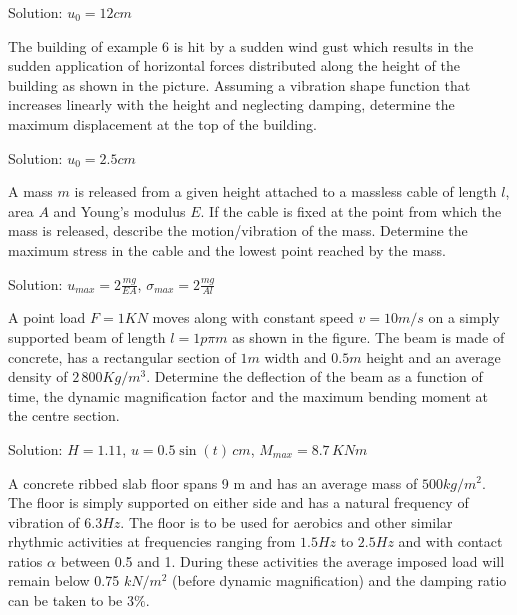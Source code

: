 \documentclass{problems}
\begin{document}
\begin{center}
\end{center}

Solution: $u_0 = 12cm$



 The building of example 6 is hit by a sudden wind gust which results in the sudden application of horizontal forces distributed along the height of the building as shown in the picture. Assuming a vibration shape function that increases linearly with the height and neglecting damping, determine the maximum displacement at the top of the building.

\begin{center}
\end{center}

Solution: $u_0 = 2.5cm$



 A mass $m$ is released from a given height attached to a massless cable of length $l$, area $A$ and Young's modulus $E$. If the cable is fixed at the point from which the mass is released, describe the motion/vibration of the mass. Determine the maximum stress in the cable and the lowest point reached by the mass.

\begin{center}
\end{center}

Solution: $u_{max} = 2\frac{mg}{EA}$, $\sigma_{max} = 2\frac{mg}{Al}$



 A point load $F=1KN$ moves along with constant speed $v=10m/s$ on a simply supported beam of length $l=1p\pi m$ as shown in the figure. The beam is made of concrete, has a rectangular section of $1m$ width and $0.5m$ height and an average density of $2\,800Kg/m^3$. Determine the deflection of the beam as a function of time, the dynamic magnification factor and the maximum bending moment at the centre section.

\begin{center}
\end{center}

Solution: $H=1.11$, $u=0.5\sin(t)\,cm$, $M_{max} = 8.7\,KNm$


 A concrete ribbed slab floor spans 9 m and has an average mass of $500 kg/m^2$. The floor is simply supported on either side and has a natural frequency of vibration of $6.3 Hz$. The floor is to be used for aerobics and other similar rhythmic activities at frequencies ranging from $1.5 Hz$ to $2.5 Hz$ and with contact ratios $\alpha$ between 0.5 and 1. During these activities the average imposed load will remain below 0.75 $kN/m^2$ (before dynamic magnification) and the damping ratio can be taken to be $3\%$.
\end{document}
